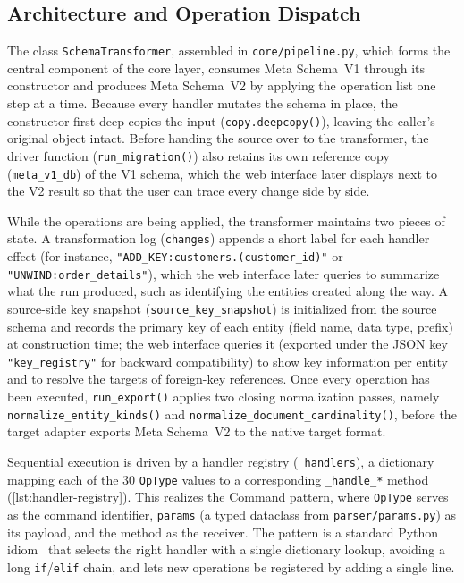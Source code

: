 \subsection{Architecture and Operation Dispatch}\label{subsec:transformer-arch}

  The class \texttt{SchemaTransformer}, assembled in \texttt{core/pipeline.py}, which forms the
  central component of the core layer, consumes Meta Schema~V1 through its
  constructor and produces Meta Schema~V2 by applying the operation list one
  step at a time. Because every handler mutates the schema in place, the
  constructor first deep-copies the input (\texttt{copy.deepcopy()}), leaving
  the caller's original object intact. Before handing the source over to the
  transformer, the driver function (\texttt{run\_migration()}) also retains
  its own reference copy (\texttt{meta\_v1\_db}) of the V1 schema, which the
  web interface later displays next to the V2 result so that the user can
  trace every change side by side.

  While the operations are being applied, the transformer maintains two
  pieces of state. A transformation log (\texttt{changes}) appends a short
  label for each handler effect (for instance,
  \texttt{"ADD\_KEY:customers.(customer\_id)"} or
  \texttt{"UNWIND:order\_details"}), which the web interface later queries
  to summarize what the run produced, such as identifying the entities
  created along the way. A source-side key snapshot
  (\texttt{source\_key\_snapshot}) is initialized from the source schema
  and records the primary key of each entity (field name, data type,
  prefix) at construction time; the web interface queries it (exported
  under the JSON key \texttt{"key\_registry"} for backward compatibility)
  to show key information per entity and to resolve the targets of
  foreign-key references. Once every operation has been executed, \texttt{run\_export()} applies two closing normalization passes, namely \texttt{normalize\_entity\_kinds()} and \texttt{normalize\_document\_cardinality()}, before the target adapter exports Meta Schema~V2 to the native target format.

  Sequential execution is driven by a handler registry (\texttt{\_handlers}),
  a dictionary mapping each of the 30 \texttt{OpType} values to a
  corresponding \texttt{\_handle\_*} method (\autoref{lst:handler-registry}).
  This realizes the Command pattern, where \texttt{OpType} serves as the
  command identifier, \texttt{params} (a typed dataclass from
  \texttt{parser/params.py}) as its payload, and the method as the
  receiver. The pattern is a standard Python idiom~\cite{ramalho2022fluent}
  that selects the right handler with a single dictionary lookup, avoiding a
  long \texttt{if}/\texttt{elif} chain, and lets new operations be registered
  by adding a single line.

